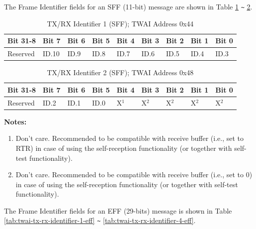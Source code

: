 \documentclass[main\_\_EN.tex]{subfiles}
\begin{document}
The Frame Identifier fields for an SFF (11-bit) message are shown in Table \ref{tab:twai-tx-rx-identifier-1-sff} \verb+~+ \ref{tab:twai-tx-rx-identifier-2-sff}.

\begin{longtable}[c]{|p{1.4cm}|p{1.4cm}|p{1.4cm}|p{1.4cm}|p{1.4cm}|p{1.4cm}|p{1.4cm}|p{1.4cm}|p{1.4cm}|}
    \caption{TX/RX Identifier 1 (SFF); TWAI Address 0x44}
    \label{tab:twai-tx-rx-identifier-1-sff}\\
    \hline
    \rowcolor{lightgray}
    \textbf{Bit 31-8} & \textbf{Bit 7} & \textbf{Bit 6} & \textbf{Bit 5} & \textbf{Bit 4} & \textbf{Bit 3} & \textbf{Bit 2} & \textbf{Bit 1} & \textbf{Bit 0}\\\hline

    Reserved & ID.10 & ID.9 & ID.8 & ID.7 & ID.6 & ID.5 & ID.4 & ID.3\\
    \hline
\end{longtable}

\begin{longtable}[c]{|p{1.4cm}|p{1.4cm}|p{1.4cm}|p{1.4cm}|p{1.4cm}|p{1.4cm}|p{1.4cm}|p{1.4cm}|p{1.4cm}|}
    \caption{TX/RX Identifier 2 (SFF); TWAI Address 0x48}
    \label{tab:twai-tx-rx-identifier-2-sff}\\
    \hline
       \rowcolor{lightgray}
    \textbf{Bit 31-8} & \textbf{Bit 7} & \textbf{Bit 6} & \textbf{Bit 5} & \textbf{Bit 4} & \textbf{Bit 3} & \textbf{Bit 2} & \textbf{Bit 1} & \textbf{Bit 0}\\\hline
    Reserved & ID.2 & ID.1 & ID.0 & X$^1$ & X$^2$ & X$^2$ & X$^2$ & X$^2$\\
    \hline
\end{longtable}
\vspace{-1.5em}
{\bfseries Notes:}\\
\begin{enumerate}
    \item Don't care. Recommended to be compatible with receive buffer (i.e., set to RTR) in case of using the self-reception functionality (or together with self-test functionality).
    \item Don't care. Recommended to be compatible with receive buffer (i.e., set to 0) in case of using the self-reception functionality (or together with self-test functionality).
\end{enumerate}


\clearpage
The Frame Identifier fields for an EFF (29-bits) message is shown in Table \ref{tab:twai-tx-rx-identifier-1-eff} \verb+~+ \ref{tab:twai-tx-rx-identifier-4-eff}.
\end{document}
